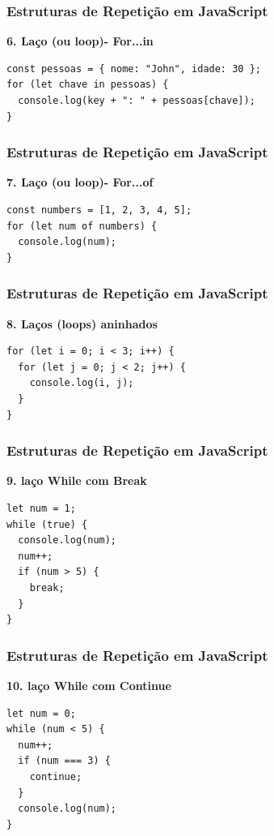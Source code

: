 \documentclass[13pt, xcolor={dvipsnames,svgnames}, portuguese]{beamer}
\begin{document}
\begin{frame}[fragile]
\frametitle{Estruturas de Repetição em JavaScript}

\textbf{6. Laço (ou loop)- For...in}

\begin{verbatim}
const pessoas = { nome: "John", idade: 30 };
for (let chave in pessoas) {
  console.log(key + ": " + pessoas[chave]);
}
\end{verbatim}

\end{frame}
\begin{frame}[fragile]
\frametitle{Estruturas de Repetição em JavaScript}

\textbf{7. Laço (ou loop)- For...of}

\begin{verbatim}
const numbers = [1, 2, 3, 4, 5];
for (let num of numbers) {
  console.log(num);
}
\end{verbatim}

\end{frame}
\begin{frame}[fragile]
\frametitle{Estruturas de Repetição em JavaScript}

\textbf{8. Laços (loops) aninhados}

\begin{verbatim}
for (let i = 0; i < 3; i++) {
  for (let j = 0; j < 2; j++) {
    console.log(i, j);
  }
}
\end{verbatim}

\end{frame}
\begin{frame}[fragile]
\frametitle{Estruturas de Repetição em JavaScript}

\textbf{9. laço While com Break}

\begin{verbatim}
let num = 1;
while (true) {
  console.log(num);
  num++;
  if (num > 5) {
    break;
  }
}
\end{verbatim}

\end{frame}
\begin{frame}[fragile]
\frametitle{Estruturas de Repetição em JavaScript}

\textbf{10. laço While com Continue}

\begin{verbatim}
let num = 0;
while (num < 5) {
  num++;
  if (num === 3) {
    continue;
  }
  console.log(num);
}
\end{verbatim}

\end{frame}
\end{document}
